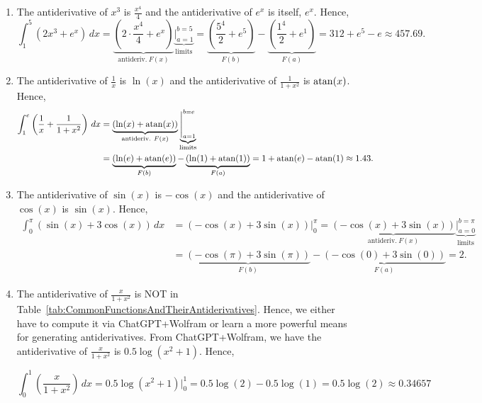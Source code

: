 \solution


\begin{enumerate}
\renewcommand{\labelenumi}{(\alph{enumi})}
\setlength{\itemsep}{.2cm}
    \item The antiderivative of $x^3$ is $\frac{x^4}{4}$ and the antiderivative of $e^x$ is itself, $e^x$. Hence, 
    $$\int_1^5 \left(2 x^3 + e^x \right)\,dx =    \underbrace{\left(2 \cdot \frac{x^4}{4} + e^x \right)}_{\text{antideriv.}~F(x)} \underbrace{\Bigg|_{a=1}^{b=5}}_{\text{limits}} =  \underbrace{\left( \frac{5^4}{2} + e^5\right)}_{F(b)}  - \underbrace{\left( \frac{1^4}{2} + e^1\right)}_{F(a)} = 312 + e^5 - e \approx 457.69.$$
    
     \item  The antiderivative of $\frac{1}{x}$ is $\ln(x)$ and the antiderivative of $\frac{1}{1 + x^2}$ is $\mathrm{atan}(x)$. Hence, 
    \begin{align*}
        \int_1^e \left(\frac{1}{x}+ \frac{1}{1 + x^2} \right)\,dx &=    \underbrace{\left( \ln(x) +  \mathrm{atan}(x) \right)}_{\text{antideriv.}~F(x)} \underbrace{\Bigg|_{a=1}^{b=e}}_{\text{limits}} \\
        &=  \underbrace{\left( \ln(e) +  \mathrm{atan}(e)\right)}_{F(b)}  - \underbrace{\left( \ln(1) +  \mathrm{atan}(1)\right)}_{F(a)} = 1 + \mathrm{atan}(e) - \mathrm{atan}(1) \approx 1.43.
    \end{align*}    
     
   
      \item The antiderivative of $\sin(x)$ is $-\cos(x)$ and the antiderivative of $\cos(x)$ is $\sin(x)$. Hence, 
    \begin{align*}\int_0^\pi \left( \sin(x) + 3 \cos(x)\right)\,dx &= \left( -\cos(x) + 3\sin(x)\right) \Bigg|_0^\pi =    \underbrace{\left(-\cos(x) + 3\sin(x) \right)}_{\text{antideriv.}~F(x)} \underbrace{\Bigg|_{a=0}^{b=\pi}}_{\text{limits}} \\
    &=  \underbrace{\left( -\cos(\pi) + 3\sin(\pi)\right)}_{F(b)}  - \underbrace{\left( -\cos(0) + 3\sin(0)\right)}_{F(a)} = 2.
    \end{align*}


        \item The antiderivative of $ \frac{x}{1 + x^2}$ is NOT in Table~\ref{tab:CommonFunctionsAndTheirAntiderivatives}. Hence, we either have to compute it via ChatGPT+Wolfram or learn a more powerful means for generating antiderivatives. From ChatGPT+Wolfram, we have the antiderivative of $\frac{x}{1 + x^2}$ is $0.5 \log(x^2 + 1)$. Hence, 
        
        $$\int_0^1 \left(  \frac{x}{1 + x^2}\right)\,dx = 0.5 \log(x^2 + 1) \Bigg|_0^1 = 0.5 \log(2) - 0.5\log(1) = 0.5 \log(2) \approx 0.34657$$
\end{enumerate}


